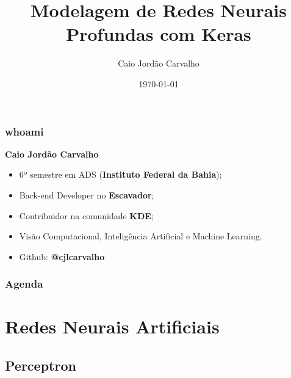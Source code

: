\documentclass{beamer}
\title[Deep Learning com Keras]{Modelagem de Redes Neurais Profundas com Keras} %
\author{Caio Jordão Carvalho} %
\institute[IFBA] %
{
Instituto Federal da Bahia \\ %
\medskip
\textit{caiojcarvalho@gmail.com} %
}
\date{\today}
\begin{document}
\begin{frame}
\titlepage %
\end{frame}

\begin{frame}
\frametitle{whoami}
\textbf{Caio Jordão Carvalho}
\begin{itemize}
    \item 6º semestre em ADS (\textbf{Instituto Federal da Bahia});
    \item Back-end Developer no \textbf{Escavador};
    \item Contribuidor na comunidade \textbf{KDE};
    \item Visão Computacional, Inteligência Artificial e Machine Learning.
    \item Github: \textbf{@cjlcarvalho}
\end{itemize}
\end{frame}

\begin{frame}
\frametitle{Agenda} %
\tableofcontents %
\end{frame}


\section{Redes Neurais Artificiais} %

\subsection{Perceptron} %
\end{document}
